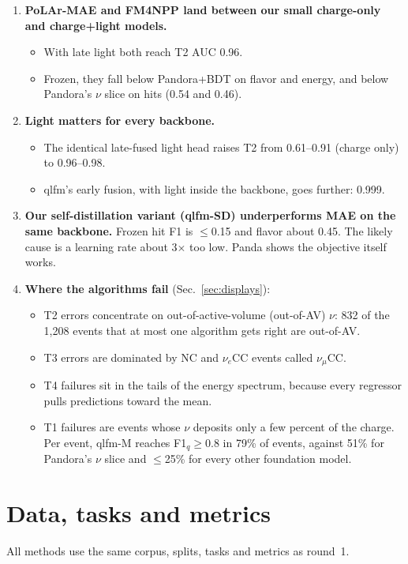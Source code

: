 \documentclass[11pt,a4paper]{article}
\newcommand{\nue}{\ensuremath{\nu_e}}
\newcommand{\numu}{\ensuremath{\nu_\mu}}
\begin{document}
\begin{enumerate}[leftmargin=*]
\item \textbf{PoLAr-MAE and FM4NPP land between our small charge-only and charge+light models.}
  \begin{itemize}
    \item With late light both reach T2 AUC 0.96.
    \item Frozen, they fall below Pandora+BDT on flavor and energy, and below Pandora's $\nu$ slice on hits (0.54 and 0.46).
  \end{itemize}

\item \textbf{Light matters for every backbone.}
  \begin{itemize}
    \item The identical late-fused light head raises T2 from 0.61--0.91 (charge only) to 0.96--0.98.
    \item qlfm's early fusion, with light inside the backbone, goes further: 0.999.
  \end{itemize}

\item \textbf{Our self-distillation variant (qlfm-SD) underperforms MAE on the same backbone.} Frozen hit F1 is $\leq$0.15 and flavor about 0.45. The likely cause is a learning rate about 3$\times$ too low. Panda shows the objective itself works.

\item \textbf{Where the algorithms fail} (Sec.~\ref{sec:displays}):
  \begin{itemize}
    \item T2 errors concentrate on out-of-active-volume (out-of-AV) $\nu$: 832 of the 1{,}208 events that at most one algorithm gets right are out-of-AV.
    \item T3 errors are dominated by NC and \nue CC events called \numu CC.
    \item T4 failures sit in the tails of the energy spectrum, because every regressor pulls predictions toward the mean.
    \item T1 failures are events whose $\nu$ deposits only a few percent of the charge. Per event, qlfm-M reaches F1$_q\geq0.8$ in 79\% of events, against 51\% for Pandora's $\nu$ slice and $\leq$25\% for every other foundation model.
  \end{itemize}
\end{enumerate}

\section{Data, tasks and metrics}
All methods use the same corpus, splits, tasks and metrics as round~1.
\end{document}
